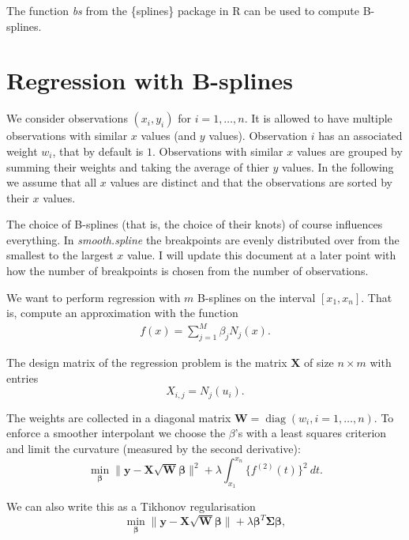 \documentclass[a4paper]{scrartcl}
\newcommand{\vv}[1]{\ensuremath{\bm{#1}}}
\newcommand{\mat}[1]{\ensuremath{\bm{#1}}}
\newcommand{\T}[1]{\ensuremath{{#1}^{T}}}
\newcommand\dd{\ensuremath{\:d}}
\DeclareMathOperator\diag{diag}
\begin{document}
The function \textit{bs} from the \{splines\} package in R can be used to compute B-splines.


\section{Regression with B-splines}
\label{sec:regression}

We consider observations $(x_i, y_i)$ for $i = 1, \ldots, n$. 
It is allowed to have multiple observations with similar $x$ values (and $y$ values).
Observation $i$ has an associated weight $w_i$, that by default is $1$.
Observations with similar $x$ values are grouped by summing their weights and taking the average of thier $y$ values.
In the following we assume that all $x$ values are distinct and that the observations are sorted by their $x$ values.

The choice of B-splines (that is, the choice of their knots) of course influences everything.
In \textit{smooth.spline} the breakpoints are evenly distributed over from the smallest to the largest $x$ value.
I will update this document at a later point with how the number of breakpoints is chosen from the number of observations.

We want to perform regression with $m$ B-splines on the interval $[x_1, x_n]$.
That is, compute an approximation with the function
\begin{align*}
    f(x) = \sum_{j=1}^M \beta_j N_j(x).
\end{align*}

The design matrix of the regression problem is the matrix $\mat X$ of size $n\times m$ with entries
\begin{equation*}
    X_{i,j} = N_j(u_i).
\end{equation*}

The weights are collected in a diagonal matrix $\mat W = \diag(w_i, i = 1, \ldots, n)$.
To enforce a smoother interpolant we choose the $\beta$'s with a least squares criterion and limit the curvature (measured by the second derivative):
\begin{equation*}
    \min_{\vv \beta} \|\vv y - \mat X \sqrt{\mat W} \vv \beta\|^2 + \lambda \int_{x_1}^{x_n} \bigl\{f^{(2)}(t)\bigr\}^2 \dd t.
\end{equation*}

We can also write this as a Tikhonov regularisation
\begin{equation*}
    \min_{\vv \beta} \|\vv y - \mat X \sqrt{\mat W} \vv \beta\| + \lambda \T{\vv\beta} \mat\Sigma \vv\beta,
\end{equation*}
\end{document}
